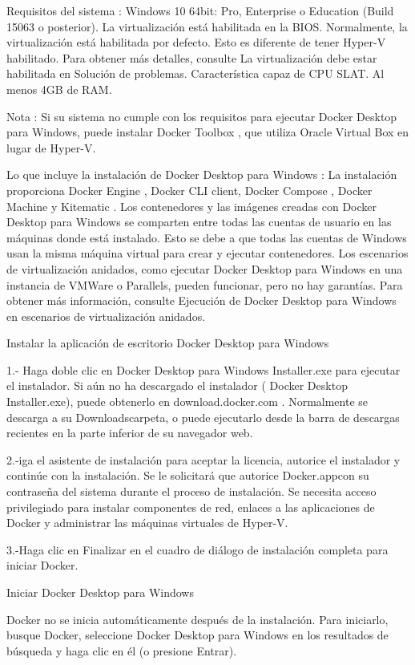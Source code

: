 \documentclass[twoside,onecolumn]{article}
\begin{document}
\begin{flushright}
\begin{itemize}
Requisitos del sistema :
Windows 10 64bit: Pro, Enterprise o Education (Build 15063 o posterior).
La virtualización está habilitada en la BIOS. Normalmente, la virtualización está habilitada por defecto. Esto es diferente de tener Hyper-V habilitado. Para obtener más detalles, consulte La virtualización debe estar habilitada en Solución de problemas.
Característica capaz de CPU SLAT.
Al menos 4GB de RAM.

Nota : Si su sistema no cumple con los requisitos para ejecutar Docker Desktop para Windows, puede instalar Docker Toolbox , que utiliza Oracle Virtual Box en lugar de Hyper-V.


Lo que incluye la instalación de Docker Desktop para Windows : La instalación proporciona Docker Engine , Docker CLI client, Docker Compose , Docker Machine y Kitematic .
Los contenedores y las imágenes creadas con Docker Desktop para Windows se comparten entre todas las cuentas de usuario en las máquinas donde está instalado. Esto se debe a que todas las cuentas de Windows usan la misma máquina virtual para crear y ejecutar contenedores.
Los escenarios de virtualización anidados, como ejecutar Docker Desktop para Windows en una instancia de VMWare o Parallels, pueden funcionar, pero no hay garantías. Para obtener más información, consulte Ejecución de Docker Desktop para Windows en escenarios de virtualización anidados.

Instalar la aplicación de escritorio Docker Desktop para Windows

1.- Haga doble clic en Docker Desktop para Windows Installer.exe para ejecutar el instalador.
Si aún no ha descargado el instalador ( Docker Desktop Installer.exe), puede obtenerlo en download.docker.com . Normalmente se descarga a su Downloadscarpeta, o puede ejecutarlo desde la barra de descargas recientes en la parte inferior de su navegador web.

2.-iga el asistente de instalación para aceptar la licencia, autorice el instalador y continúe con la instalación.
Se le solicitará que autorice Docker.appcon su contraseña del sistema durante el proceso de instalación. Se necesita acceso privilegiado para instalar componentes de red, enlaces a las aplicaciones de Docker y administrar las máquinas virtuales de Hyper-V.

3.-Haga clic en Finalizar en el cuadro de diálogo de instalación completa para iniciar Docker.


Iniciar Docker Desktop para Windows

Docker no se inicia automáticamente después de la instalación. Para iniciarlo, busque Docker, seleccione Docker Desktop para Windows en los resultados de búsqueda y haga clic en él (o presione Entrar).


\end{itemize}
\end{flushright}
\end{document}
